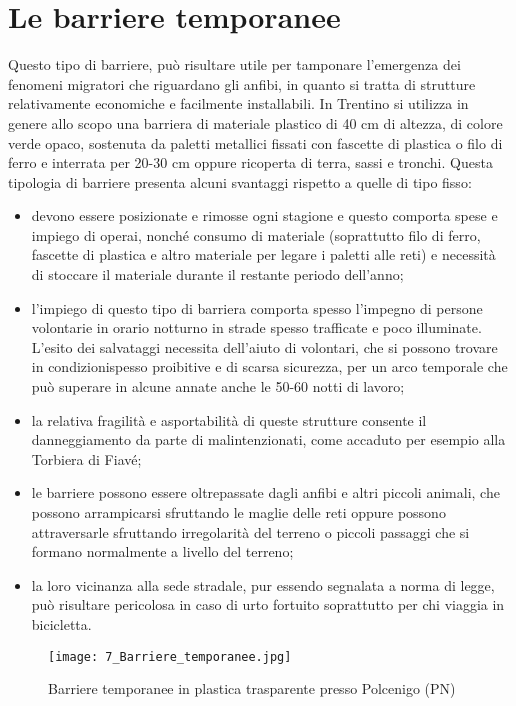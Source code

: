 \documentclass[11pt,a4paper,twoside]{memoir}
\begin{document}
\section{Le barriere temporanee}
\label{sec:actions_barrtemp}
Questo tipo di barriere, può risultare utile per tamponare l'emergenza dei fenomeni migratori che riguardano gli anfibi, in quanto si tratta di strutture relativamente economiche e facilmente installabili. In Trentino si utilizza in genere allo scopo una barriera di materiale plastico di 40 cm di altezza, di colore verde opaco, sostenuta da paletti metallici fissati con fascette di plastica o filo di ferro e interrata per 20-30 cm oppure ricoperta di terra, sassi e tronchi.
Questa tipologia di barriere presenta alcuni svantaggi rispetto a quelle di tipo fisso:
\begin{itemize}\itemsep0pt
  \item devono essere posizionate e rimosse ogni stagione e questo comporta spese e impiego di operai, nonché consumo di materiale (soprattutto filo di ferro, fascette di plastica e altro materiale per legare i paletti alle reti) e necessità di stoccare il materiale durante il restante periodo dell'anno;
  \item l'impiego di questo tipo di barriera comporta spesso l'impegno di persone volontarie in orario notturno in strade spesso trafficate e poco illuminate. L'esito dei salvataggi necessita dell’aiuto di volontari, che si possono trovare in condizionispesso proibitive e di scarsa sicurezza, per un arco temporale che può superare in alcune annate anche le 50-60 notti di lavoro;
  \item la relativa fragilità e asportabilità di queste strutture consente il danneggiamento da parte di malintenzionati, come accaduto per esempio alla Torbiera di Fiavé;
  \item le barriere possono essere oltrepassate dagli anfibi e altri piccoli animali, che possono arrampicarsi sfruttando le maglie delle reti oppure possono attraversarle sfruttando irregolarità del terreno o piccoli passaggi che si formano normalmente a livello del terreno;
  \item la loro vicinanza alla sede stradale, pur essendo segnalata a norma di legge, può risultare pericolosa in caso di urto fortuito soprattutto per chi viaggia in bicicletta.
\end{itemize}

\begin{figure}[H]
\label{fig:barr_temp}
\centering
  \texttt{[image: 7\_Barriere\_temporanee.jpg]}
\caption{Barriere temporanee in plastica trasparente presso Polcenigo (PN)}
\end{figure}
\end{document}
